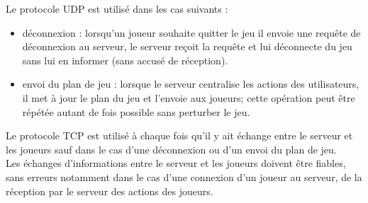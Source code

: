 \par
Le protocole UDP est utilisé dans les cas suivants :
\begin{itemize}
	\item déconnexion : lorsqu'un joueur souhaite quitter le jeu il envoie une requête de déconnexion au serveur, le serveur reçoit la requête et lui déconnecte du jeu sans lui en informer (sans accusé de réception).
	
	\item envoi du plan de jeu : lorsque le serveur centralise les actions des utilisateurs, il met à jour le plan du jeu et l'envoie aux joueurs; cette opération peut être répétée autant de fois possible sans perturber le jeu.\\
\end{itemize}

\par
Le protocole TCP est utilisé à chaque fois qu'il y ait échange entre le serveur et les joueurs sauf dans le cas d'une déconnexion ou d'un envoi du plan de jeu.\\

Les échanges d'informations entre le serveur et les joueurs doivent être fiables, sans erreurs notamment dans le cas d'une connexion d'un joueur au serveur, de la réception par le serveur des actions des joueurs. \\